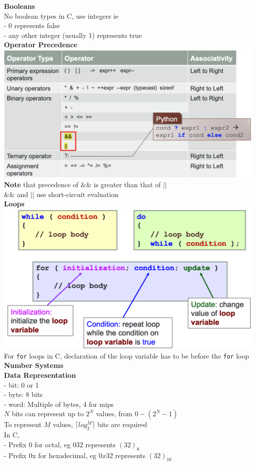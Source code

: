 \documentclass[10pt, a4paper]{article}
\newcommand{\highlight}[1]{{\color{red}\textbf{#1}}}
\begin{document}
\begin{multicols*}{3}
		\textbf{Booleans}\\
		No boolean types in C, use integers ie\\
		- 0 represents false\\
		- any other integer (usually 1) represents true\\
		
		\textbf{Operator Precedence}\\
		\includegraphics[scale= .5]{./assets/logicOperators}\\
		\highlight{Note} that precedence of $\&\&$ is greater than that of $||$\\
		$\&\&$ and $||$ use short-circuit evaluation\\
		
		\textbf{Loops}\\
		\includegraphics[scale=0.23]{./assets/loops}\\
		For \texttt{for} loops in C, declaration of the loop variable has to be before the \texttt{for} loop\\
		{\normalsize\textbf{Number Systems}}\\
		\textbf{Data Representation}\\
		- bit: 0 or 1\\
		- byte: 8 bits\\
		- word: Multiple of bytes, 4 for mips\\
		$N$ bits can represent up to $2^N$ values, from $0 - (2^N - 1)$\\ 
		To represent $M$ values, $\lceil{log_2^M}\rceil$ bits are required\\
		In C,\\
		- Prefix 0 for octal, eg $032$ represents $(32)_8$\\
		- Prefix 0x for hexadecimal, eg $0x32$ represents $(32)_16$\\
		

\end{multicols*}
\end{document}
